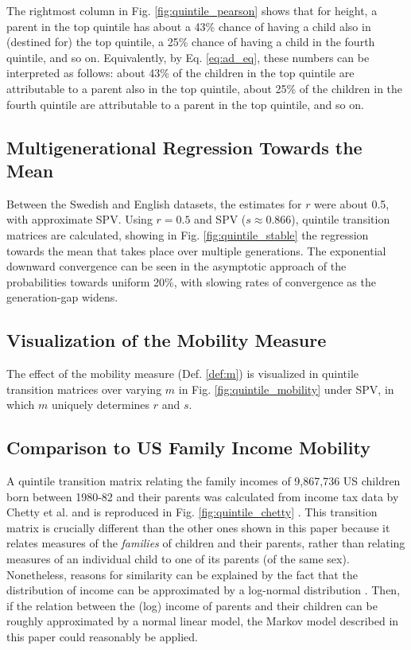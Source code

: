 \documentclass{svproc} %
\begin{document}
The rightmost column in Fig. \ref{fig:quintile_pearson} shows that for height, a parent in the top quintile has about a 43\% chance of having a child also in (destined for) the top quintile, a 25\% chance of having a child in the fourth quintile, and so on. Equivalently, by Eq. \ref{eq:ad_eq}, these numbers can be interpreted as follows: about 43\% of the children in the top quintile are attributable to a parent also in the top quintile, about 25\% of the children in the fourth quintile are attributable to a parent in the top quintile, and so on. 


\subsection{Multigenerational Regression Towards the Mean}

Between the Swedish and English datasets, the estimates for $r$ were about 0.5, with approximate SPV. Using $r = 0.5$ and SPV ($s \approx 0.866$), quintile transition matrices are calculated, showing in Fig. \ref{fig:quintile_stable} the regression towards the mean that takes place over multiple generations. The exponential downward convergence can be seen in the asymptotic approach of the probabilities towards uniform 20\%, with slowing rates of convergence as the generation-gap widens. 


\subsection{Visualization of the Mobility Measure}

The effect of the mobility measure (Def. \ref{def:m}) is visualized in quintile transition matrices over varying $m$ in Fig. \ref{fig:quintile_mobility} under SPV, in which $m$ uniquely determines $r$ and $s$.


\subsection{Comparison to US Family Income Mobility}

A quintile transition matrix relating the family incomes of 9,867,736 US children born between 1980-82 and their parents was calculated from income tax data by Chetty et al. and is reproduced in Fig. \ref{fig:quintile_chetty} \cite{chetty}. This transition matrix is crucially different than the other ones shown in this paper because it relates measures of the \emph{families} of children and their parents, rather than relating measures of an individual child to one of its parents (of the same sex). Nonetheless, reasons for similarity can be explained by the fact that the distribution of income can be approximated by a log-normal distribution \cite{battistin, neal}. Then, if the relation between the (log) income of parents and their children can be roughly approximated by a normal linear model, the Markov model described in this paper could reasonably be applied.
\end{document}
